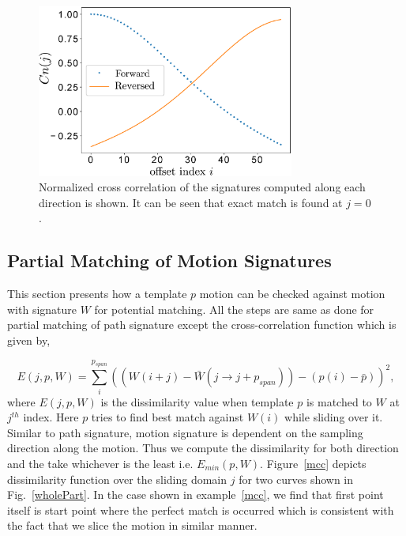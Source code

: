 \documentclass[twocolumn,10pt]{asme2e}
\begin{document}
\begin{figure}
\centering
\includegraphics[width=240pt]{figure/fig_ncc.eps}
  \caption{Normalized cross correlation of the signatures computed along each direction is shown. It can be seen that exact match is found at $j=0$.}
\label{ncc}
\end{figure}

\subsection{Partial Matching of Motion Signatures}\label{sec_mcc}
This section presents how a template $p$ motion can be checked against motion with signature $W$ for potential matching.
All the steps are same as done for partial matching of path signature except the cross-correlation function which is given by,

\begin{equation}\label{mccEq}
  E(j, p, W) = \sum_{i}^{p_{span}} {((W(i+j) - \bar{W}(j\to j + p_{span})) - (p(i) - \bar{p}))}^2,
\end{equation}
where $E(j, p, W)$ is the dissimilarity value when template $p$ is matched to $W$ at $j^{th}$ index. Here $p$ tries to find best match against $W(i)$ while sliding over it.
Similar to path signature, motion signature is dependent on the sampling direction along the motion. Thus we compute the dissimilarity for both direction and the take whichever is the least i.e. $E_{min}(p, W)$.
Figure~\ref{mcc} depicts dissimilarity function over the sliding domain $j$ for two curves shown in Fig.~\ref{wholePart}.
In the case shown in example~\ref{mcc}, we find that first point itself is start point where the perfect match is occurred which is consistent with the fact that we slice the motion in similar manner.
\end{document}
